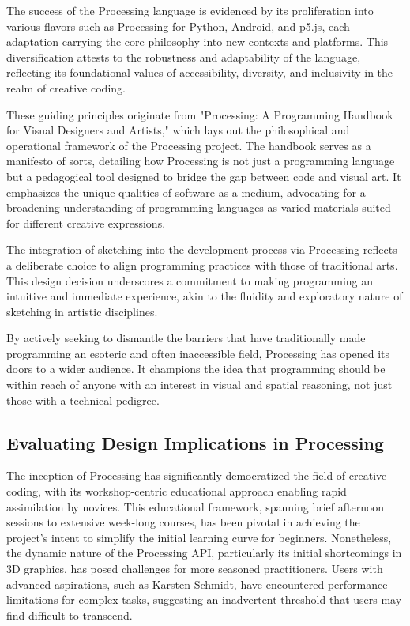 The success of the Processing language is evidenced by its proliferation into various flavors such as Processing for Python, Android, and p5.js, each adaptation carrying the core philosophy into new contexts and platforms. This diversification attests to the robustness and adaptability of the language, reflecting its foundational values of accessibility, diversity, and inclusivity in the realm of creative coding.

These guiding principles originate from "Processing: A Programming Handbook for Visual Designers and Artists,"\parencite{reasProcessingProgrammingHandbook2007a} which lays out the philosophical and operational framework of the Processing project. The handbook serves as a manifesto of sorts, detailing how Processing is not just a programming language but a pedagogical tool designed to bridge the gap between code and visual art. It emphasizes the unique qualities of software as a medium, advocating for a broadening understanding of programming languages as varied materials suited for different creative expressions.

The integration of sketching into the development process via Processing reflects a deliberate choice to align programming practices with those of traditional arts. This design decision underscores a commitment to making programming an intuitive and immediate experience, akin to the fluidity and exploratory nature of sketching in artistic disciplines.

By actively seeking to dismantle the barriers that have traditionally made programming an esoteric and often inaccessible field, Processing has opened its doors to a wider audience. It champions the idea that programming should be within reach of anyone with an interest in visual and spatial reasoning, not just those with a technical pedigree.

\subsection{Evaluating Design Implications in Processing}

The inception of Processing has significantly democratized the field of creative coding, with its workshop-centric educational approach enabling rapid assimilation by novices. This educational framework, spanning brief afternoon sessions to extensive week-long courses, has been pivotal in achieving the project's intent to simplify the initial learning curve for beginners. Nonetheless, the dynamic nature of the Processing API, particularly its initial shortcomings in 3D graphics, has posed challenges for more seasoned practitioners. Users with advanced aspirations, such as Karsten Schmidt, have encountered performance limitations for complex tasks, suggesting an inadvertent threshold that users may find difficult to transcend.

